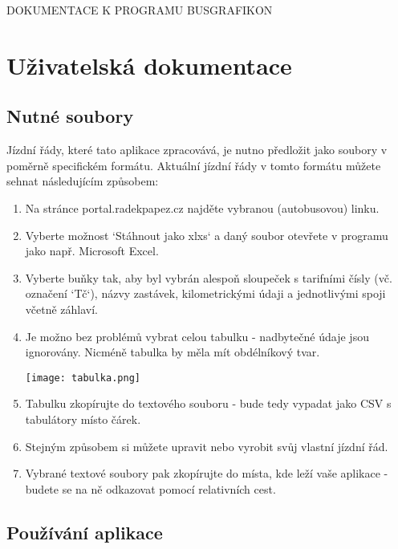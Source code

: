 \documentclass[14pt]{article}
\begin{document}
\begin{center}
  \uppercase{Dokumentace k programu BusGrafikon}
\end{center}

\section{Uživatelská dokumentace}

\subsection{Nutné soubory}
Jízdní řády, které tato aplikace zpracovává, je nutno předložit jako soubory v poměrně specifickém formátu. Aktuální jízdní řády v tomto formátu můžete sehnat následujícím způsobem:
\begin{enumerate}
\item Na stránce portal.radekpapez.cz najděte vybranou (autobusovou) linku.
\item Vyberte možnost `Stáhnout jako xlxs` a daný soubor otevřete v programu jako např. Microsoft Excel.
\item Vyberte buňky tak, aby byl vybrán alespoň sloupeček s tarifními čísly (vč. označení `Tč`), názvy zastávek, kilometrickými údaji a jednotlivými spoji včetně záhlaví.
\item Je možno bez problémů vybrat celou tabulku - nadbytečné údaje jsou ignorovány. Nicméně tabulka by měla mít obdélníkový tvar. 

\begin{center}
\texttt{[image: tabulka.png]}
\end{center}


\item Tabulku zkopírujte do textového souboru - bude tedy vypadat jako CSV s tabulátory místo čárek.
\item Stejným způsobem si můžete upravit nebo vyrobit svůj vlastní jízdní řád.
\item Vybrané textové soubory pak zkopírujte do místa, kde leží vaše aplikace - budete se na ně odkazovat pomocí relativních cest.
\end{enumerate}

\subsection{Používání aplikace}
\end{document}
